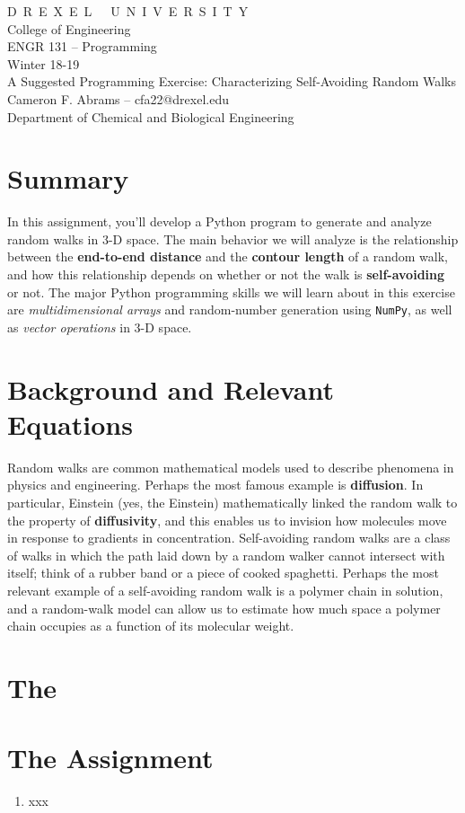 \documentclass[11pt]{article}
\newif \ifshowsolutions
\begin{document}
\begin{centering}
{\sc D\ R\ E\ X\ E\ L\ \ \ U\ N\ I\ V\ E\ R\ S\ I\ T\ Y}\\
College of Engineering\\
ENGR 131 -- Programming \\
Winter 18-19\\
A Suggested Programming Exercise:  Characterizing Self-Avoiding Random Walks\\
Cameron F. Abrams -- cfa22@drexel.edu\\
Department of Chemical and Biological Engineering\\
\ifshowsolutions
\textcolor{blue}{S\ O\ L\ U\ T\ I\ O\ N\ S}\\
\fi
\end{centering}

\section*{Summary}
In this assignment, you'll develop a Python program to generate and analyze random walks in 3-D space.  The main behavior we will analyze is the relationship between the {\bf end-to-end distance} and the {\bf contour length} of a random walk, and how this relationship depends on whether or not the walk is {\bf self-avoiding} or not.  
The major Python programming skills we will learn about in this exercise are {\em multidimensional arrays} and random-number generation using {\tt NumPy}, as well as {\em vector operations} in 3-D space.

\section*{Background and Relevant Equations}

Random walks are common mathematical models used to describe phenomena in physics and engineering.  Perhaps the most famous example is {\bf diffusion}.  In particular, Einstein (yes, the Einstein) mathematically linked the random walk to the property of {\bf diffusivity}, and this enables us to invision how molecules move in response to gradients in concentration.  Self-avoiding random walks are a class of walks in which the path laid down by a random walker cannot intersect with itself; think of a rubber band or a piece of cooked spaghetti.  Perhaps the most relevant example of a self-avoiding random walk is a polymer chain in solution, and a random-walk model can allow us to estimate how much space a polymer chain occupies as a function of its molecular weight.  

\section*{The }

\section*{The Assignment}

\begin{enumerate}
	\item xxx
\end{enumerate}
\end{document}
